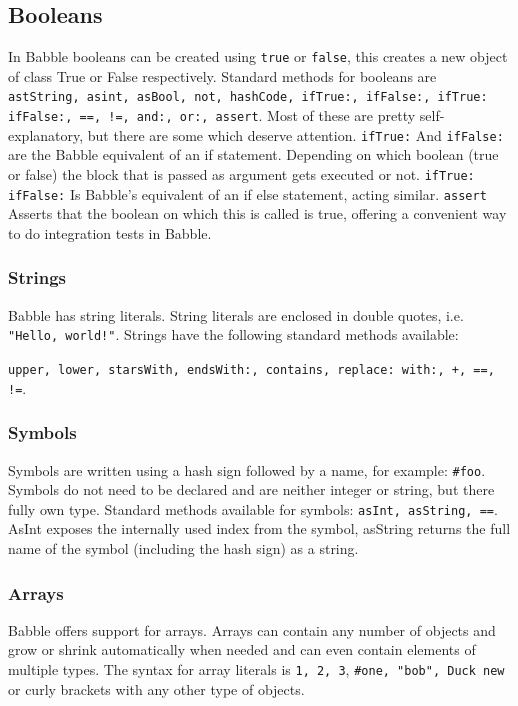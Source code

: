 \documentclass[a4paper]{article}
\begin{document}
\subsection{Booleans}
In Babble booleans can be created using \texttt{true} or  \texttt{false}, this creates a new object of class True or False respectively. Standard methods for booleans are
\texttt{astString, asint, asBool, not, hashCode, ifTrue:, ifFalse:, ifTrue: ifFalse:, ==, !=, and:, or:, assert}. Most of these are pretty self-explanatory, but there are some which deserve attention. \texttt{ifTrue:} And \texttt{ifFalse:} are the Babble equivalent of an if statement. Depending on which boolean (true or false) the block that is passed as argument gets executed or not. \texttt{ifTrue: ifFalse:} Is Babble's equivalent of an if else statement, acting similar. \texttt{assert} Asserts that the boolean on which this is called is true, offering a convenient way to do integration tests in Babble.


\subsubsection{Strings}

Babble has string literals. String literals are enclosed in double quotes, i.e. \texttt{"Hello, world!"}. Strings have the following standard methods available:

\texttt{upper, lower, starsWith, endsWith:, contains, replace: with:, +, ==, !=}.

\subsubsection{Symbols}

Symbols are written using a hash sign followed by a name, for example: \texttt{\#foo}. Symbols do not need to be declared and are neither integer or string, but there fully own type. Standard methods available for symbols:
\texttt{asInt, asString, ==}. AsInt exposes the internally used index from the symbol, asString returns the full name of the symbol (including the hash sign) as a string.

\subsubsection{Arrays}

Babble offers support for arrays. Arrays can contain any number of objects and grow or shrink automatically when needed and can even contain elements of multiple types. The syntax for array literals is \texttt{1, 2, 3}, \texttt{\#one, "bob", Duck new} or curly brackets with any other type of objects.
\end{document}
